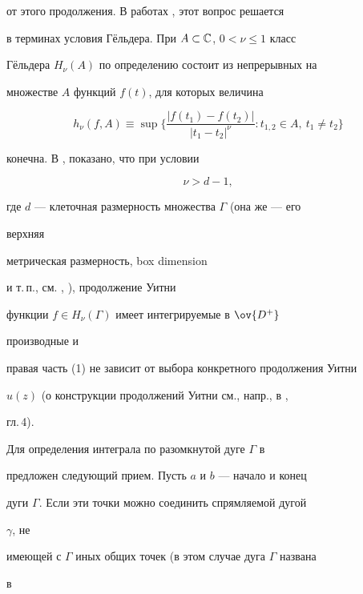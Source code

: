 от этого продолжения. В работах \cite{3}, \cite{4} этот вопрос решается 


в терминах условия Г\"ельдера. При $A\subset\Bbb C$, $0<\nu\le 1$ класс 


Г\"ельдера $H_\nu(A)$ по определению состоит из непрерывных на 


множестве $A$ функций $f(t)$, для которых величина 


\begin{equation} 


 h_\nu(f,A)\equiv\sup\bigg\{ 


\frac{|f(t_1)-f(t_2)|}{|t_1-t_2|^\nu}:t_{1,2}\in A,\ t_1\ne t_2 


\bigg\} 


\end{equation} 


конечна. В \cite{3}, \cite{4} показано, что при условии 


\begin{equation} 


\nu>d-1,


\end{equation} 


где $d$ --- клеточная размерность множества $\Gamma$ (она же --- его 


верхняя 


метрическая размерность, box dimension 


и т.\,п., см. \cite{1}, \cite{2}), продолжение Уитни 


функции $f\in H_\nu(\Gamma)$ имеет интегрируемые в $\ov{D^+}$ 


производные и 


правая часть (1) не зависит от выбора конкретного продолжения Уитни 


$u(z)$ (о конструкции продолжений Уитни см., напр., в \cite{6}, 


гл.\,4). 


 


Для определения интеграла по разомкнутой дуге $\Gamma$ в \cite{4} 


предложен следующий прием. Пусть $a$ и $b$ --- начало и конец 


дуги $\Gamma$. Если эти точки можно соединить спрямляемой дугой 


$\gamma$, не 


имеющей с $\Gamma$ иных общих точек (в этом случае дуга $\Gamma$ названа 


в \cite{4} 


